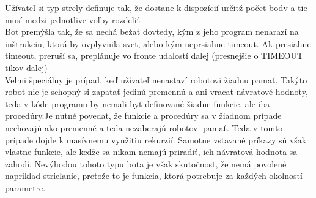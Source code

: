 Užívateľ si typ strely definuje tak, že dostane k dispozícií určitź počet bodv a tie musí medzi jednotlive volby rozdeliť\\
Bot premýšla tak, že sa nechá bežat dovtedy, kým z jeho program nenarazí na inštrukciu, ktorá by ovplyvnila svet, alebo kým neprsiahne timeout. Ak presiahne timeout, preruší sa, preplánuje vo fronte udalostí ďalej (presnejšie o TIMEOUT tikov ďalej)\\
Velmi špeciálny je prípad, keď užívateľ nenastaví robotovi žiadnu pamať. Takýto robot nie je schopný si zapatať jedinú premennú a ani vracat návratové hodnoty, teda v kóde programu by nemali byť definované žiadne funkcie, ale iba procedúry.Je nutné povedať, že funkcie a procedúry sa v žiadnom prípade nechovajú ako premenné a teda nezaberajú robotovi pamať. Teda v tomto prípade dojde k masívnemu využitiu rekurzií. Samotne vstavané príkazy sú však vlastne funkcie, ale kedže sa nikam nemajú priradiť, ich návratová hodnota sa zahodí. Nevýhodou tohoto typu bota je však skutočnost, že nemá povolené napriklad strieľanie, pretože to je funkcia, ktorá potrebuje za každých okolností parametre.
